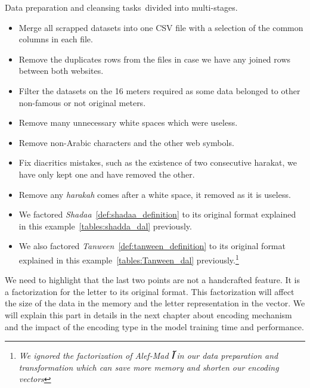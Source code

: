 Data preparation and cleansing tasks divided into multi-stages.
\begin{itemize}
\item Merge all scrapped datasets into one CSV file with a selection of the common columns in each file.
\item Remove the duplicates rows from the files in case we have any joined rows between both websites.
\item Filter the datasets on the 16 meters required as some data belonged to other non-famous or not original meters.
\item Remove many unnecessary white spaces which were useless.
\item Remove non-Arabic characters and the other web symbols.
\item Fix diacritics mistakes, such as the existence of two consecutive harakat, we have only kept one and have removed the other. %
\item Remove any \textit{harakah} comes after a white space, it removed as it is useless. %
\item We factored \textit{Shadaa}~\ref{def:shadaa_definition} to its original format explained in this example~\ref{tables:shadda_dal} previously.
\item We also factored \textit{Tanween}~\ref{def:tanween_definition} to its original format explained in this example~\ref{tables:Tanween_dal} previously.\footnote{\textit{We ignored the factorization of Alef-Mad  \textbf{\textarabic{ آ }} in our data preparation and transformation which can save more memory and shorten our encoding vectors}}
\end{itemize}

We need to highlight that the last two points are not a handcrafted feature. It is a factorization for the letter to its original format. This factorization will affect the size of the data in the memory and the letter representation in the vector. We will explain this part in details in the next chapter about encoding mechanism and the impact of the encoding type in the model training time and performance.

